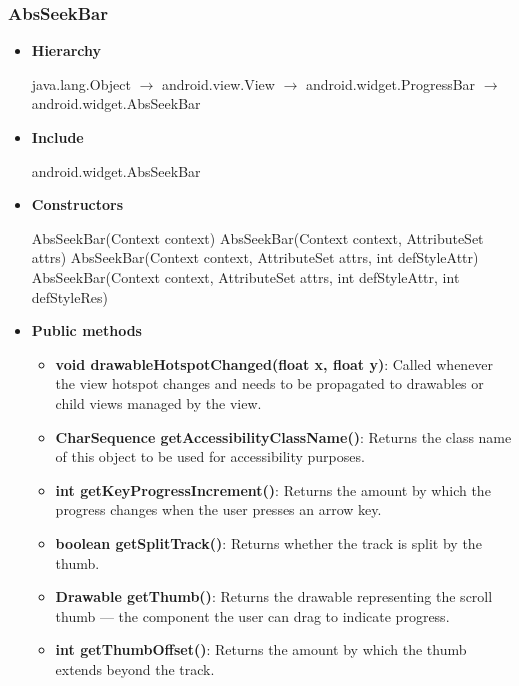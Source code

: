 \documentclass{report}
\begin{document}
    \subsubsection{AbsSeekBar}
    \begin{itemize}
         \item \textbf{Hierarchy} 
            \begin{center}
                java.lang.Object $\to$	android.view.View $\to$	android.widget.ProgressBar $\to$	android.widget.AbsSeekBar
            \end{center}
        \item \textbf{Include}
            \bigbreak \noindent 
            \begin{javacode}
            android.widget.AbsSeekBar
            \end{javacode}
        \item \textbf{Constructors}
            \bigbreak \noindent 
            \begin{javacode}
                AbsSeekBar(Context context)
                AbsSeekBar(Context context, AttributeSet attrs)
                AbsSeekBar(Context context, AttributeSet attrs, int defStyleAttr)
                AbsSeekBar(Context context, AttributeSet attrs, int defStyleAttr, int defStyleRes)
            \end{javacode}
        \item \textbf{Public methods}
            \begin{itemize}
                \item \textbf{void drawableHotspotChanged(float x, float y)}: Called whenever the view hotspot changes and needs to be propagated to drawables or child views managed by the view.
                \item \textbf{CharSequence getAccessibilityClassName()}: Returns the class name of this object to be used for accessibility purposes.
                \item \textbf{int getKeyProgressIncrement()}: Returns the amount by which the progress changes when the user presses an arrow key.
                \item \textbf{boolean getSplitTrack()}: Returns whether the track is split by the thumb.
                \item \textbf{Drawable getThumb()}: Returns the drawable representing the scroll thumb — the component the user can drag to indicate progress.
                \item \textbf{int getThumbOffset()}: Returns the amount by which the thumb extends beyond the track.

\end{itemize}
\end{itemize}
\end{document}
